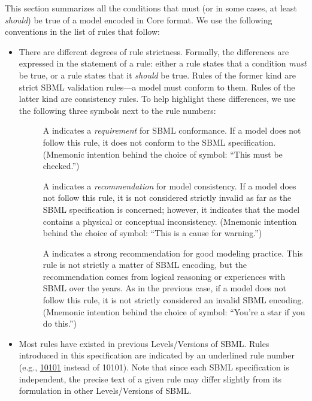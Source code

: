 This section summarizes all the conditions that must (or in some
cases, at least \emph{should}) be true of a model encoded in
\sbmlthree Core format.  We use the following conventions in the
list of rules that follow:
\begin{itemize}

\item There are different degrees of rule strictness.  Formally,
  the differences are expressed in the statement of a rule: either
  a rule states that a condition \emph{must} be true, or a rule
  states that it \emph{should} be true.  Rules of the former kind
  are strict SBML validation rules---a model must conform to them.
  Rules of the latter kind are consistency rules.  To help
  highlight these differences, we use the following three symbols
  next to the rule numbers:
  \begin{description}

  \item[\hspace*{7.8pt}\vSymbol] A \vSymbolName indicates a
    \emph{requirement} for SBML conformance. If a model does not
    follow this rule, it does not conform to the SBML
    specification.  (Mnemonic intention behind the choice of
    symbol: ``This must be checked.'')

  \item[\hspace*{8.2pt}\cSymbol] A \cSymbolName indicates a
    \emph{recommendation} for model consistency.  If a model does
    not follow this rule, it is not considered strictly invalid as
    far as the SBML specification is concerned; however, it
    indicates that the model contains a physical or conceptual
    inconsistency.  (Mnemonic intention behind the choice of
    symbol: ``This is a cause for warning.'')

  \item[\hspace*{7.5pt}\mSymbol] A \mSymbolName indicates a strong
    recommendation for good modeling practice.  This rule is not
    strictly a matter of SBML encoding, but the recommendation
    comes from logical reasoning or experiences with SBML over the
    years.  As in the previous case, if a model does not follow
    this rule, it is not strictly considered an invalid SBML
    encoding.  (Mnemonic intention behind the choice of symbol:
    ``You're a star if you do this.'')

  \end{description}

\item Most rules have existed in previous Levels/Versions of SBML.
  Rules introduced in this \sbmlthree specification are indicated
  by an underlined rule number (e.g., \underline{10101} instead of
  10101).  Note that since each SBML specification is independent,
  the precise text of a given rule may differ slightly from its
  formulation in other Levels/Versions of SBML.


\end{itemize}
